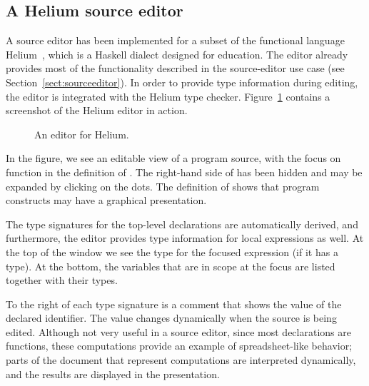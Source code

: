\subsection{A Helium source editor}



A source editor has been implemented for a subset of the functional language Helium~\cite{heeren03helium}, which is a  Haskell dialect designed for education. The editor already provides most of the functionality described in the source-editor use case (see Section~\ref{sect:sourceeditor}). In order to provide type information during editing, the editor is integrated with the Helium type checker. Figure~\ref{heliumMain} contains a screenshot of the Helium editor in action. 


\newcommand{\protoscrshot}[4]{%
\parbox{#4mm}{\begin{center} \fbox{\epsfigPrx{#1}{#4}{#2}}\\
{\small #3}\end{center}
}}%
\newcommand{\then}{\hspace{\stretch{1}}$\Rightarrow$\hspace{\stretch{1}}}



\begin{figure}
\begin{center}
\caption{An editor for Helium.}\label{heliumMain} 
\end{center}
\end{figure}

In the figure, we see an editable view of a program source, with the focus on function  in the definition of . The right-hand side of  has been hidden and may be expanded by clicking on the dots. The definition of  shows that program constructs may have a graphical presentation.

The type signatures for the top-level declarations are automatically derived, and furthermore,  the editor provides type information for local expressions as well. At the top of the window we see the type for the focused expression (if it has a type). At the bottom, the variables that are in scope at the focus are listed together with their types.

To the right of each type signature is a comment that shows the value of the declared identifier. The value changes dynamically when the source is being edited. Although not very useful in a source editor, since most declarations are functions, these computations provide an example of spreadsheet-like behavior; parts of the document that represent computations are interpreted dynamically, and the results are displayed in the presentation.

